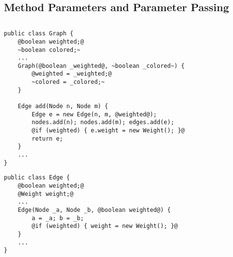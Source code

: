 \subsection{Method Parameters and Parameter Passing}
\begin{frame}[fragile]{\myframetitle}
		\begin{columns}
\begin{tiny}
\begin{lstlisting}
public class Graph {
	@boolean weighted;@
	~boolean colored;~
	...
	Graph(@boolean _weighted@, ~boolean _colored~) {
		@weighted = _weighted;@
		~colored = _colored;~
	}
	
	Edge add(Node n, Node m) {
		Edge e = new Edge(n, m, @weighted@);
		nodes.add(n); nodes.add(m); edges.add(e);
		@if (weighted) { e.weight = new Weight(); }@
		return e;
	}
	...
}
\end{lstlisting}
\begin{lstlisting}
public class Edge {
	@boolean weighted;@
	@Weight weight;@ 
	...
	Edge(Node _a, Node _b, @boolean weighted@) {
		a = _a; b = _b;
		@if (weighted) { weight = new Weight(); }@
	}
	...
}
\end{lstlisting}
\end{tiny}	
		\end{columns}
\end{frame}

